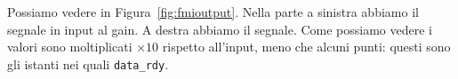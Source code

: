 \documentclass[]{IEEEtran}
\newcommand{\code}[1]{\texttt{#1}}
\newcommand{\module}[1]{\textsf{\small #1}}
\begin{document}
Possiamo vedere in Figura~\ref{fig:fmioutput}. Nella parte a sinistra abbiamo il segnale in input al \module{gain}. A destra abbiamo il segnale. Come possiamo vedere i valori sono moltiplicati $\times 10$ rispetto all'input, meno che alcuni punti: questi sono gli istanti nei quali \code{data_rdy}. 



\end{document}
